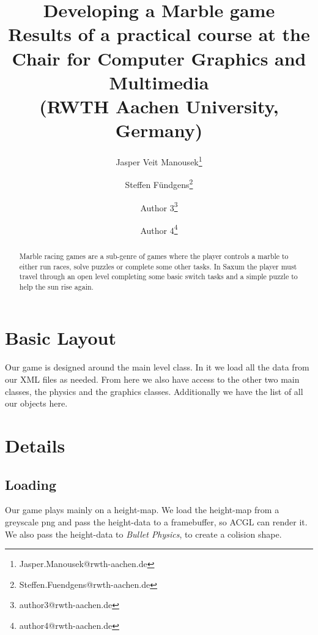 \documentclass[sponsored]{acmsiggraph}
\title{Developing a Marble game \\ \large \normalfont Results of a practical
course at the Chair for Computer Graphics and Multimedia \\ (RWTH Aachen
University, Germany)}
\author{Jasper Veit Manousek\thanks{Jasper.Manousek@rwth-aachen.de} 
\and    Steffen F\"undgens\thanks{Steffen.Fuendgens@rwth-aachen.de} 
\and    Author 3\thanks{author3@rwth-aachen.de} 
\and    Author 4\thanks{author4@rwth-aachen.de} }
\begin{document}

\maketitle

\begin{abstract}

Marble racing games are a sub-genre of games where the player controls a marble to either run races, solve puzzles or complete some other tasks. In Saxum the player must travel through an open level completing some basic switch tasks and a simple puzzle to help the sun rise again.
 
\end{abstract}

\section{Basic Layout}

Our game is designed around the main level class. In it we load all the data from our XML files as needed. From here we also have access to the other two main classes, the physics and the graphics classes. Additionally we have the list of all our objects here.

\section{Details}

\subsection{Loading}

Our game plays mainly on a height-map. We load the height-map from a greyscale png and pass the height-data to a framebuffer, so ACGL can render it. We also pass the height-data to \textit{Bullet Physics}, to create a colision shape.
\end{document}
